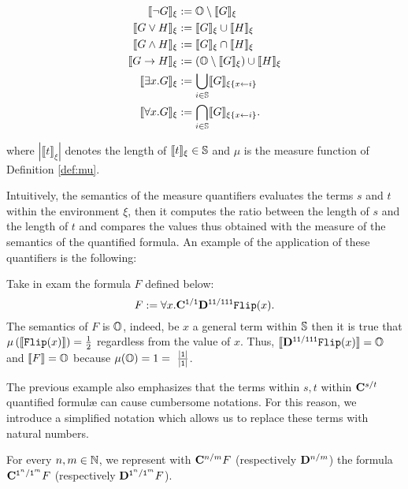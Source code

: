 \begin{defn}
\begin{minipage}{\linewidth}
\begin{minipage}[t]{0.5\linewidth}
\begin{align*}
\llbracket \neg G\rrbracket_\xi &:=
\Os\setminus\llbracket G\rrbracket_\xi \\
\llbracket G\vee H\rrbracket_\xi &:= \llbracket G\rrbracket_\xi \cup \llbracket H\rrbracket_\xi \\
%
\llbracket G\wedge H\rrbracket_\xi &:=
\llbracket G\rrbracket_\xi \cap \llbracket H\rrbracket_\xi \\
%
\llbracket G\rightarrow H\rrbracket_\xi &:=
(\Os\setminus\llbracket G\rrbracket_\xi)
\cup \llbracket H\rrbracket_\xi \\
%
\llbracket \exists x.G\rrbracket_\xi &:=
\bigcup_{i\in\Ss} \llbracket G\rrbracket_{\xi\{x\leftarrow i\}} \\
%
\llbracket \forall x.G\rrbracket_\xi &:=
\bigcap_{i\in \Ss}\llbracket G\rrbracket_{\xi\{x\leftarrow i\}}.
\end{align*}
\end{minipage}
\end{minipage}
where $|\llbracket t\rrbracket_\xi|$ denotes the length of $\llbracket t\rrbracket_\xi\in \mathbb{S}$
and $\mu$ is the measure function of Definition \ref{def:mu}.
\end{defn}
\noindent
Intuitively, the semantics of the measure quantifiers
evaluates the terms $s$ and $t$ within the environment $\xi$,
then it computes the ratio between the length of $s$ and the length of $t$
and compares the values thus obtained with the measure of the semantics of
the quantified formula. An example of the application of these quantifiers
is the following:

\begin{ex}
  Take in exam the formula $F$ defined below:
  $$
  F:=\forall x.\mathbf{C}^{\mathtt{1} / \mathtt{1}}\mathbf{D}^{\mathtt{1}\mathtt{1}/\mathtt{1}\mathtt{1}\mathtt{1}} \mathtt{Flip}(x).
  $$
  The semantics of $F$ is $\mathbb{O}$, indeed, be $x$ a general term within $\mathbb{S}$
  then it is true that $\mu \left(\llbracket \mathtt{Flip}(x)\rrbracket \right)=\frac 1 2$
  regardless from the value of $x$. Thus,
  $\llbracket \mathbf{D}^{\mathtt{1}\mathtt{1}/\mathtt{1}\mathtt{1}\mathtt{1}} \mathtt{Flip}(x)\rrbracket=\mathbb{O}$
  and $\llbracket F \rrbracket= \mathbb{O}$ because $\mu(\mathbb{O})=1=~\frac {|\mathtt{1}|}{|\mathtt{1}|}$.
\end{ex}

The previous example also emphasizes that the terms within $s, t$ within
$\mathbf{C}^{s/t}$ quantified formul\ae{} can cause cumbersome notations.
For this reason, we introduce a simplified
notation which allows us to replace these terms with natural numbers.

\begin{notation}
  For every $n, m \in \mathbb{N}$, we represent with $\mathbf{C}^{n/m}F$ (respectively $\mathbf{D}^{n/m}$)
  the formula $\mathbf{C}^{\mathtt{1}^n/\mathtt{1}^m}F$ (respectively $\mathbf{D}^{\mathtt{1}^n/\mathtt{1}^m}F$).
\end{notation}

